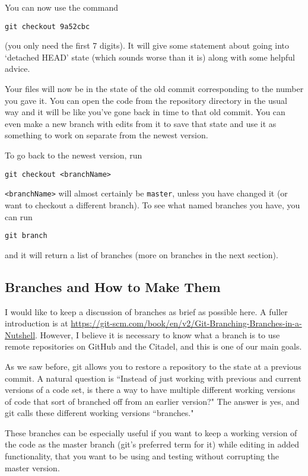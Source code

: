 \documentclass[11pt]{article}
\newcommand{\code}[1]{\quad \texttt{#1}}
\begin{document}
You can now use the command

\code{git checkout 9a52cbc}

(you only need the first 7 digits).  It will give some statement about going into `detached HEAD' state (which sounds worse than it is) along with some helpful advice.

Your files will now be in the state of the old commit corresponding to the number you gave it.  You can open the code from the repository directory in the usual way and it will be like you've gone back in time to that old commit.  You can even make a new branch with edits from it to save that state and use it as something to work on separate from the newest version.

To go back to the newest version, run

\code{git checkout <branchName>}

\texttt{<branchName>} will almost certainly be \texttt{master}, unless you have changed it (or want to checkout a different branch).  To see what named branches you have, you can run 

\code{git branch}

and it will return a list of branches (more on branches in the next section).
 
\subsection{Branches and How to Make Them}

I would like to keep a discussion of branches as brief as possible here.  A fuller introduction is at \url{https://git-scm.com/book/en/v2/Git-Branching-Branches-in-a-Nutshell}.  However, I believe it is necessary to know what a branch is to use remote repositories on GitHub and the Citadel, and this is one of our main goals.

As we saw before, git allows you to restore a repository to the state at a previous commit.  A natural question is ``Instead of just working with previous and current versions of a code set, is there a way to have multiple different working versions of code that sort of branched off from an earlier version?"  The answer is yes, and git calls these different working versions ``branches."

These branches can be especially useful if you want to keep a working version of the code as the master branch (git's preferred term for it) while editing in added functionality, that you want to be using and testing without corrupting the master version.
\end{document}

